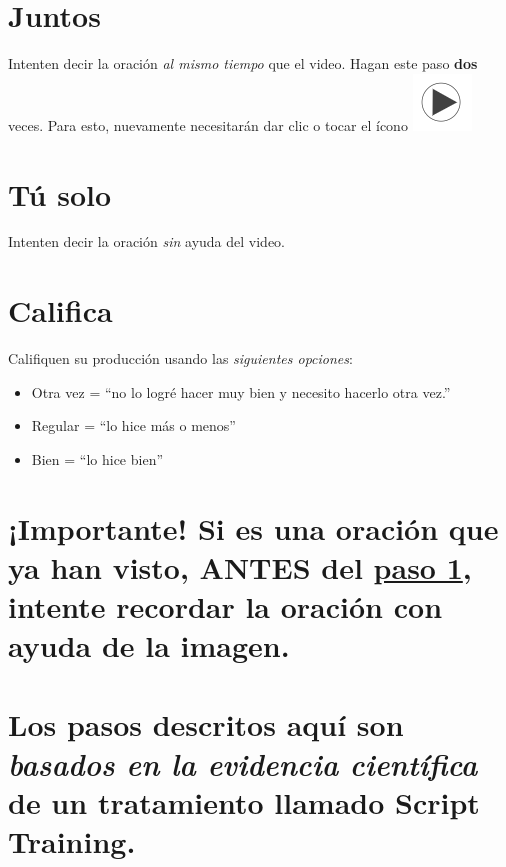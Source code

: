 \documentclass[
]{book}
\begin{document}
\section{Juntos}\label{juntos}

Intenten decir la oración \emph{al mismo tiempo} que el video. Hagan este paso \textbf{dos} veces. Para esto, nuevamente necesitarán dar clic o tocar el ícono \includegraphics{images/play_icon.png}

\section{Tú solo}\label{tuxfa-solo}

Intenten decir la oración \emph{sin} ayuda del video.

\section{Califica}\label{califica}

Califiquen su producción usando las \emph{siguientes opciones}:

\begin{itemize}
\item
  Otra vez = ``no lo logré hacer muy bien y necesito hacerlo otra vez.''
\item
  Regular = ``lo hice más o menos''
\item
  Bien = ``lo hice bien''
\end{itemize}

\section{\texorpdfstring{¡Importante! Si es una oración que \textbf{ya} han visto, ANTES del \hyperref[cross_2]{paso 1}, intente recordar la oración con ayuda de la imagen.}{¡Importante! Si es una oración que ya han visto, ANTES del paso 1, intente recordar la oración con ayuda de la imagen.}}\label{importante-si-es-una-oraciuxf3n-que-ya-han-visto-antes-del-paso-1-intente-recordar-la-oraciuxf3n-con-ayuda-de-la-imagen.}

\section{\texorpdfstring{Los pasos descritos aquí son \emph{basados en la evidencia científica} de un tratamiento llamado Script Training.}{Los pasos descritos aquí son basados en la evidencia científica de un tratamiento llamado Script Training.}}\label{los-pasos-descritos-aquuxed-son-basados-en-la-evidencia-cientuxedfica-de-un-tratamiento-llamado-script-training.}
\end{document}
